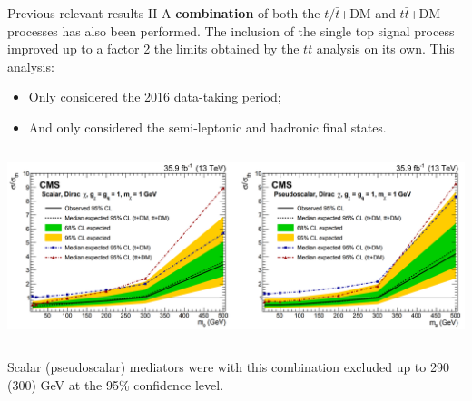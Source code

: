 \documentclass[8pt]{beamer}
\begin{document}
\begin{frame}{Previous relevant results II}
\justifying
\vspace{5pt}
A \textbf{combination} of both the $t/ \bar t$+DM and $t \bar t$+DM processes has also been performed. \vfill
The inclusion of the single top signal process \alert{improved up to a factor 2} the limits obtained by the $t \bar t$ analysis on its own. This analysis: %

\begin{itemize}
\item Only considered the 2016 data-taking period;
\item And only considered the semi-leptonic and hadronic final states.
\end{itemize} \vfill

\begin{center}
\begin{columns}
	\begin{column}{1.0\textwidth}
		\begin{center}
			\includegraphics[width=1.0\textwidth]{figs/limitsprevious.png}
    		 \end{center}
	\end{column} \hfill
\end{columns}
\end{center} \vfill

Scalar (pseudoscalar) mediators were with this combination \alert{excluded up to 290 (300) GeV} at the 95\% confidence level. \vfill %
\end{frame}
\end{document}
